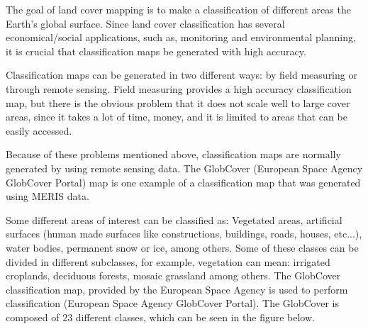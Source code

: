 The goal of land cover mapping is to make a classification of different areas the Earth's global surface. Since land cover classification has several economical/social applications, such as, monitoring and environmental planning, it is crucial that classification maps be generated with high accuracy.

Classification maps can be generated in two different ways: by field measuring or through remote sensing. Field measuring provides a high accuracy classification map, but there is the obvious problem that it does not scale well to large cover areas, since it takes a lot of time, money, and it is limited to areas that can be easily accessed. 

Because of these problems mentioned above, classification maps are normally generated by using remote sensing data. The GlobCover (European Space Agency GlobCover Portal) map is one example of a classification map that was generated using MERIS data.

Some different areas of interest can be classified as: Vegetated areas, artificial surfaces (human made surfaces like constructions, buildings, roads, houses, etc...), water bodies, permanent snow or ice, among others. Some of these classes can be divided in different subclasses, for example, vegetation can mean: irrigated croplands, deciduous forests, mosaic grassland among others. The GlobCover classification map, provided by the European Space Agency is used to perform classification (European Space Agency GlobCover Portal). The GlobCover is composed of 23 different classes, which can be seen in the figure below. 

